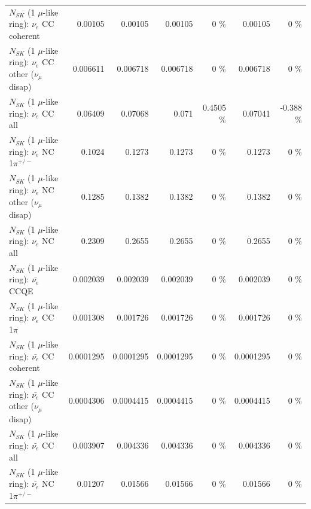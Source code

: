 \begin{table}
\begin{tabular}{| l | r | r | r  r | r  r |}
                               $N_{SK}$ (1 $\mu$-like ring): $\nu_e$ CC coherent &         0.00105 &         0.00105 &         0.00105 &        0 \%  &         0.00105 &        0 \%  \\ 
                $N_{SK}$ (1 $\mu$-like ring): $\nu_e$ CC other ($\nu_\mu$ disap) &        0.006611 &        0.006718 &        0.006718 &        0 \%  &        0.006718 &        0 \%  \\ 
                                  $N_{SK}$ (1 $\mu$-like ring): $\nu_{e}$ CC all &         0.06409 &         0.07068 &           0.071 &   0.4505 \%  &         0.07041 &   -0.388 \%  \\ 
\hline
                           $N_{SK}$ (1 $\mu$-like ring): $\nu_e$ NC 1$\pi^{+/-}$ &          0.1024 &          0.1273 &          0.1273 &        0 \%  &          0.1273 &        0 \%  \\ 
                $N_{SK}$ (1 $\mu$-like ring): $\nu_e$ NC other ($\nu_\mu$ disap) &          0.1285 &          0.1382 &          0.1382 &        0 \%  &          0.1382 &        0 \%  \\ 
                                  $N_{SK}$ (1 $\mu$-like ring): $\nu_{e}$ NC all &          0.2309 &          0.2655 &          0.2655 &        0 \%  &          0.2655 &        0 \%  \\ 
\hline
\hline
\hline
                                $N_{SK}$ (1 $\mu$-like ring): $\bar{\nu_e}$ CCQE &        0.002039 &        0.002039 &        0.002039 &        0 \%  &        0.002039 &        0 \%  \\ 
                           $N_{SK}$ (1 $\mu$-like ring): $\bar{\nu_e}$ CC 1$\pi$ &        0.001308 &        0.001726 &        0.001726 &        0 \%  &        0.001726 &        0 \%  \\ 
                         $N_{SK}$ (1 $\mu$-like ring): $\bar{\nu_e}$ CC coherent &       0.0001295 &       0.0001295 &       0.0001295 &        0 \%  &       0.0001295 &        0 \%  \\ 
          $N_{SK}$ (1 $\mu$-like ring): $\bar{\nu_e}$ CC other ($\nu_\mu$ disap) &       0.0004306 &       0.0004415 &       0.0004415 &        0 \%  &       0.0004415 &        0 \%  \\ 
                            $N_{SK}$ (1 $\mu$-like ring): $\bar{\nu_{e}}$ CC all &        0.003907 &        0.004336 &        0.004336 &        0 \%  &        0.004336 &        0 \%  \\ 
\hline
                     $N_{SK}$ (1 $\mu$-like ring): $\bar{\nu_e}$ NC 1$\pi^{+/-}$ &         0.01207 &         0.01566 &         0.01566 &        0 \%  &         0.01566 &        0 \%  \\ 

\end{tabular}
\end{table}
